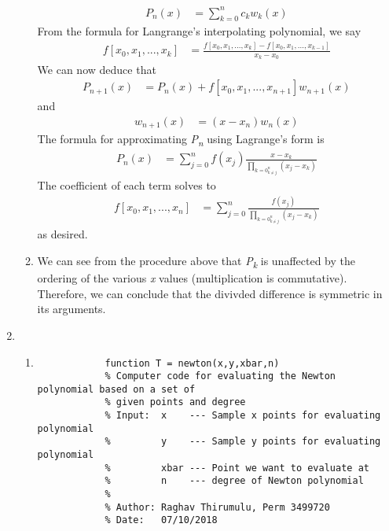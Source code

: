 \documentclass{article}
\begin{document}
\begin{enumerate}
\begin{enumerate}
                \begin{align*}
                    P_{n}(x) &= \sum_{k=0}^{n} c_{k}w_k(x) 
                \end{align*}
            From the formula for Langrange's interpolating polynomial, we say
                \begin{align*}
                    f[x_{0},x_{1},...,x_{k}] &= \frac{f[x_{0},x_{1},...,x_{k}] - f[x_{0},x_{1},...,x_{k-1}]}{x_k-x_{0}}
                \end{align*}
            We can now deduce that
                \begin{align*}
                    P_{n+1}(x) &= P_{n}(x) + f[x_{0},x_{1},...,x_{n+1}]w_{n+1}(x)
                \end{align*}
            and
                \begin{align*}
                    w_{n+1}(x) &= (x-x_{n})w_{n}(x)
                \end{align*}
            The formula for approximating \textit{P\textsubscript{n}} using Lagrange's form is
                \begin{align*}
                    P_{n}(x) &= \sum_{j=0}^{n} f(x_{j}) \frac{x-x_{k}}{\prod_{k=0}_{k \neq j}^{n}(x_{j}-x_{k})}
                \end{align*}
            The coefficient of each term solves to
                \begin{align*}
                    f[x_{0},x_{1},...,x_{n}] &= \sum_{j=0}^{n} \frac{f(x_{j})}{\prod_{k=0}_{k \neq j}^{n}(x_{j}-x_{k})}
                \end{align*}
            as desired. 
            \item %
                We can see from the procedure above that \textit{P\textsubscript{k}} is unaffected by the ordering of the various \textit{x} values (multiplication is commutative). Therefore, we can conclude that the divivded difference is symmetric in its arguments. 
        \end{enumerate}
    \item %
        \begin{enumerate}
            \item %
            \begin{lstlisting}
            function T = newton(x,y,xbar,n)
            % Computer code for evaluating the Newton polynomial based on a set of
            % given points and degree
            % Input:  x    --- Sample x points for evaluating polynomial
            %         y    --- Sample y points for evaluating polynomial
            %         xbar --- Point we want to evaluate at
            %         n    --- degree of Newton polynomial
            %
            % Author: Raghav Thirumulu, Perm 3499720
            % Date:   07/10/2018


\end{lstlisting}
\end{enumerate}
\end{enumerate}
\end{document}
